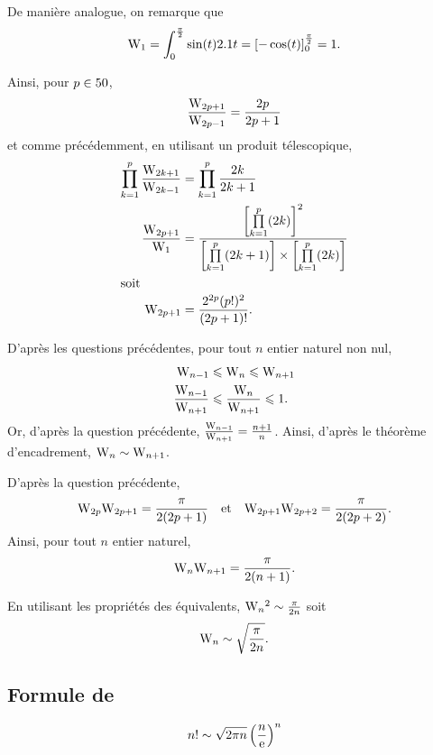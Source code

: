 \begin{solution}
\begin{reponses}
\item De manière analogue, on remarque que
\[
\mathrm{W}_1
= \int_0^{\frac{\pi}{2}} \sin(t) 2.1 t
= \left[-\cos(t)\right]_0^{\frac{\pi}{2}}
= 1.
\]

Ainsi, pour $p \in 50$,
\[
\frac{\mathrm{W}_{2p+1}}{\mathrm{W}_{2p-1}} = \frac{2p}{2p+1}
\]
et comme précédemment, en utilisant un produit télescopique, 
\begin{align*}
\prod_{k=1}^p \frac{\mathrm{W}_{2k+1}}{\mathrm{W}_{2k-1}} &= \prod_{k=1}^p \frac{2k}{2k+1}\\
\frac{\mathrm{W}_{2p+1}}{\mathrm{W}_1} &= \frac{\left[\prod\limits_{k=1}^p (2k)\right]^2}{\left[\prod\limits_{k=1}^p (2k+1)\right] \times \left[\prod\limits_{k=1}^p (2k)\right]}\\
\intertext{soit}
\mathrm{W}_{2p+1} &= \frac{2^{2p} (p!)^2}{(2p+1)!}.
\end{align*}

\item D'après les questions précédentes, pour tout $n$ entier naturel non nul,
\begin{align*}
\mathrm{W}_{n-1} &\leqslant \mathrm{W}_n \leqslant \mathrm{W}_{n+1}\\
\frac{\mathrm{W}_{n-1}}{\mathrm{W}_{n+1}} &\leqslant \frac{\mathrm{W}_n}{\mathrm{W}_{n+1}} \leqslant 1.
\end{align*}
Or, d'après la question précédente, $\frac{\mathrm{W}_{n-1}}{\mathrm{W}_{n+1}} = \frac{n+1}{n}$. Ainsi, d'après le théorème d'encadrement, $\mathrm{W}_n \sim \mathrm{W}_{n+1}$.

\item D'après la question précédente,
\[
\mathrm{W}_{2p} \mathrm{W}_{2p+1} = \frac{\pi}{2 (2 p + 1)}
\quad \text{et} \quad
\mathrm{W}_{2p+1} \mathrm{W}_{2p+2} = \frac{\pi}{2 (2p+2)}.
\]
Ainsi, pour tout $n$ entier naturel,
\[
\mathrm{W}_n \mathrm{W}_{n+1} = \frac{\pi}{2 (n + 1)}.
\]

\item En utilisant les propriétés des équivalents, $\mathrm{W}_n{}^2 \sim \frac{\pi}{2 n}$ soit
\[
\mathrm{W}_n \sim \sqrt{\frac{\pi}{2 n}}.
\]
\end{reponses}
\end{solution}

\subsection{Formule de } \label{preuve_stirling}

\begin{theo}
\[
n! \sim \sqrt{2 \pi n} \left(\frac{n}{\mathrm{e}}\right)^n
\]
\end{theo}

